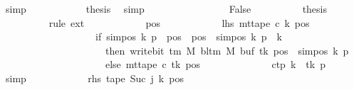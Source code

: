 \begin{isabellebody}
\ simp\isanewline
\ \ \ \ \ \ \ \ \isamarkupfalse%
\ \isamarkupfalse%
\ {\isacharquery}{\kern0pt}thesis\ \isamarkupfalse%
\ simp\isanewline
\ \ \ \ \ \ \isamarkupfalse%
\isanewline
\ \ \ \ \ \ \ \ \isamarkupfalse%
\ False\isanewline
\ \ \ \ \ \ \ \ \isamarkupfalse%
\ {\isacharquery}{\kern0pt}thesis\isanewline
\ \ \ \ \ \ \ \ \isamarkupfalse%
\ {\isacharparenleft}{\kern0pt}rule\ ext{\isacharparenright}{\kern0pt}\isanewline
\ \ \ \ \ \ \ \ \ \ \isamarkupfalse%
\ pos\isanewline
\ \ \ \ \ \ \ \ \ \ \isamarkupfalse%
\ lhs{\isacharcolon}{\kern0pt}\ {\isachardoublequoteopen}mt{\isacharunderscore}{\kern0pt}tape\ c{\isacharprime}{\kern0pt}\ k\ pos\isanewline
\ \ \ \ \ \ \ \ \ \ \ \ \ \ \ \ \ \ {\isacharequal}{\kern0pt}\ {\isacharparenleft}{\kern0pt}if\ sim{\isacharunderscore}{\kern0pt}pos\ {\isacharquery}{\kern0pt}k\ {\isacharquery}{\kern0pt}p\ {\isasymle}\ pos\ {\isasymand}\ pos\ {\isacharless}{\kern0pt}\ sim{\isacharunderscore}{\kern0pt}pos\ {\isacharquery}{\kern0pt}k\ {\isacharquery}{\kern0pt}p\ {\isacharplus}{\kern0pt}\ {\isacharquery}{\kern0pt}k\isanewline
\ \ \ \ \ \ \ \ \ \ \ \ \ \ \ \ \ \ \ \ \ then\ write{\isacharunderscore}{\kern0pt}bit\ {\isacharparenleft}{\kern0pt}{\isasymGamma}{\isacharunderscore}{\kern0pt}tm\ M{\isacharparenright}{\kern0pt}\ {\isacharparenleft}{\kern0pt}bl{\isacharunderscore}{\kern0pt}tm\ M{\isacharparenright}{\kern0pt}\ {\isacharparenleft}{\kern0pt}buf\ {\isacharquery}{\kern0pt}tk{\isacharparenright}{\kern0pt}\ {\isacharparenleft}{\kern0pt}pos\ {\isacharminus}{\kern0pt}\ sim{\isacharunderscore}{\kern0pt}pos\ {\isacharquery}{\kern0pt}k\ {\isacharquery}{\kern0pt}p{\isacharparenright}{\kern0pt}\isanewline
\ \ \ \ \ \ \ \ \ \ \ \ \ \ \ \ \ \ \ \ \ else\ mt{\isacharunderscore}{\kern0pt}tape\ c\ {\isacharquery}{\kern0pt}tk\ pos{\isacharparenright}{\kern0pt}{\isachardoublequoteclose}\isanewline
\ \ \ \ \ \ \ \ \ \ \ \ \isamarkupfalse%
\ c{\isacharprime}{\kern0pt}{\isacharunderscore}{\kern0pt}tp\ {\isacartoucheopen}k\ {\isacharequal}{\kern0pt}\ {\isacharquery}{\kern0pt}tk{\isacartoucheclose}\ {\isacartoucheopen}{\isacharquery}{\kern0pt}p\ {\isasymnoteq}\ {}{\isacartoucheclose}\ \isamarkupfalse%
\ simp\isanewline
\ \ \ \ \ \ \ \ \ \ \isamarkupfalse%
\ rhs{\isacharcolon}{\kern0pt}\ {\isachardoublequoteopen}{\isacharquery}{\kern0pt}tape\ {\isacharparenleft}{\kern0pt}Suc\ j{\isacharparenright}{\kern0pt}\ k\ pos\isanewline

\end{isabellebody}

